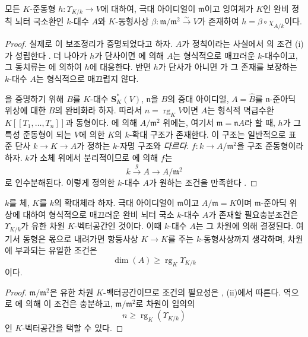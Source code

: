 \begin{lemma}[22.2.5.2]
\label{0.22.2.5.2-ko}
모든 $K$-준동형 $h:\Upsilon_{K/k}\to V$에 대하여, 극대 아이디얼이
$\mathfrak m$이고 잉여체가 $K$인 완비 정칙 뇌터 국소환인 $k$-대수
$A$와 $K$-동형사상
$\beta:\mathfrak m/\mathfrak m^2\xrightarrow{\sim}V$가 존재하여
$h=\beta\circ\chi_{A/k}$이다.
\end{lemma}

\begin{proof}
실제로 이 보조정리가 증명되었다고 하자. $A$가 정칙이라는 사실에서
의 조건 (i)가 성립한다
. 더 나아가 $h$가 단사이면
에 의해 $A$는 형식적으로 매끄러운 $k$-대수이고,
그 동치류는 에 의하여 $h$에 대응한다. 반면 $h$가
단사가 아니면 가 그 존재를 보장하는 $k$-대수
$A$는 형식적으로 매끄럽지 않다.

을 증명하기 위해 $B$를 $K$-대수
$\mathbf S_K^*(V)$, $\mathfrak n$을 $B$의 증대 아이디얼, $A=\widehat B$를
$\mathfrak n$-준아딕 위상에 대한 $B$의 완비화라 하자. 따라서
$n=\operatorname{rg}_KV$이면 $A$는 형식적 멱급수환
$K[[T_1,\ldots,T_n]]$과 동형이다. 에 의해
$A/\mathfrak m^2$ 위에는, 여기서 $\mathfrak m=\mathfrak nA$라 할 때,
$h$가 그 특성 준동형이 되는 $V$에 의한 $K$의 $k$-확대 구조가 존재한다.
이 구조는 일반적으로 표준 단사 $k\to K\to A$가 정하는 $k$-자명 구조와
\emph{다르다}. $f:k\to A/\mathfrak m^2$을 구조 준동형이라 하자. $k$가
소체 위에서 분리적이므로 에 의해 $f$는
\[
  k\xrightarrow{g}A\longrightarrow A/\mathfrak m^2
\]
로 인수분해된다. 이렇게 정의한 $k$-대수 $A$가 원하는 조건을 만족한다
.
\end{proof}

\begin{theorem}[22.2.6]
\label{0.22.2.6-ko}
$k$를 체, $K$를 $k$의 확대체라 하자. 극대 아이디얼이 $\mathfrak m$이고
$A/\mathfrak m=K$이며 $\mathfrak m$-준아딕 위상에 대하여 형식적으로
매끄러운 완비 뇌터 국소 $k$-대수 $A$가 존재할 필요충분조건은
$\Upsilon_{K/k}$가 유한 차원 $K$-벡터공간인 것이다. 이때 $k$-대수
$A$는 그 차원에 의해 결정된다. 여기서 동형은 몫으로 내려가면 항등사상
$K\to K$를 주는 $k$-동형사상까지 생각하며, 차원에 부과되는 유일한
조건은
\[
  \dim(A)\geqslant\operatorname{rg}_K\Upsilon_{K/k}
\]
이다.
\end{theorem}

\begin{proof}
$\mathfrak m/\mathfrak m^2$은 유한 차원 $K$-벡터공간이므로 조건의
필요성은 , (ii)에서 따른다. 역으로
에 의해 이 조건은 충분하고,
$\mathfrak m/\mathfrak m^2$로 차원이 임의의
\[
  n\geqslant\operatorname{rg}_K(\Upsilon_{K/k})
\]
인 $K$-벡터공간을 택할 수 있다.
\end{proof}

